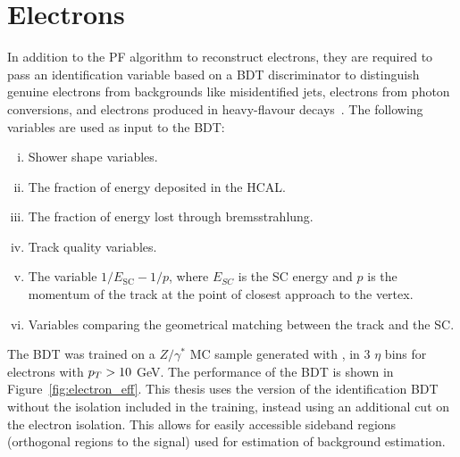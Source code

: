 \section{Electrons}

In addition to the \ac{PF} algorithm to reconstruct electrons, they are required to pass an identification variable based on a \ac{BDT} discriminator to distinguish genuine electrons from backgrounds like misidentified jets, electrons from photon conversions, and electrons produced in heavy-flavour decays~\cite{CMS:2015xaf}.
The following variables are used as input to the \ac{BDT}:

\begin{enumerate}[i)]
\item Shower shape variables.
\item The fraction of energy deposited in the \ac{HCAL}.
\item The fraction of energy lost through bremsstrahlung.
\item Track quality variables.
\item The variable $1/E_{\text{SC}} - 1/p$, where $E_{SC}$ is the \ac{SC} energy and $p$ is the momentum of the track at the point of closest approach to the vertex.
\item Variables comparing the geometrical matching between the track and the \ac{SC}.
\end{enumerate}

The \ac{BDT} was trained on a $Z/\gamma^{*}$ \ac{MC} sample generated with \MADGRAPH, in 3 $\eta$ bins for electrons with $p_{T}>10$ GeV.
The performance of the \ac{BDT} is shown in Figure~\ref{fig:electron_eff}.
This thesis uses the version of the identification \ac{BDT} without the isolation included in the training, instead using an additional cut on the electron isolation. 
This allows for easily accessible sideband regions (orthogonal regions to the signal) used for estimation of background estimation. \\

